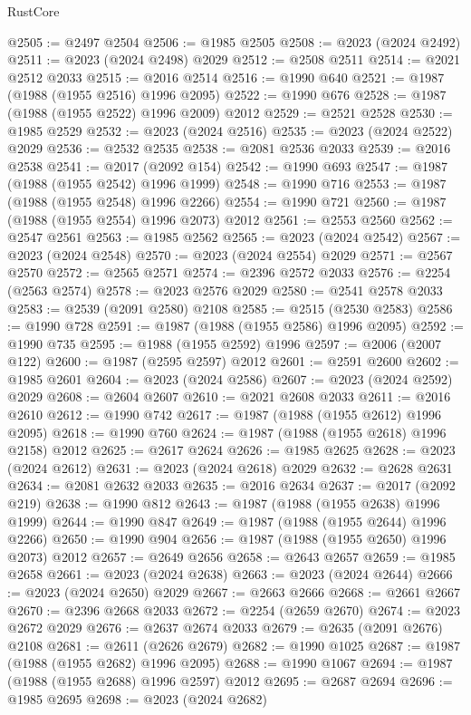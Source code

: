 \begin{lexlean}{RustCore}
\begin{coremodule}
@2505 := @2497 @2504
@2506 := @1985 @2505
@2508 := @2023 (@2024 @2492)
@2511 := @2023 (@2024 @2498) @2029
@2512 := @2508 @2511
@2514 := @2021 @2512 @2033
@2515 := @2016 @2514
@2516 := @1990 @640
@2521 := @1987 (@1988 (@1955 @2516) @1996 @2095)
@2522 := @1990 @676
@2528 := @1987 (@1988 (@1955 @2522) @1996 @2009) @2012
@2529 := @2521 @2528
@2530 := @1985 @2529
@2532 := @2023 (@2024 @2516)
@2535 := @2023 (@2024 @2522) @2029
@2536 := @2532 @2535
@2538 := @2081 @2536 @2033
@2539 := @2016 @2538
@2541 := @2017 (@2092 @154)
@2542 := @1990 @693
@2547 := @1987 (@1988 (@1955 @2542) @1996 @1999)
@2548 := @1990 @716
@2553 := @1987 (@1988 (@1955 @2548) @1996 @2266)
@2554 := @1990 @721
@2560 := @1987 (@1988 (@1955 @2554) @1996 @2073) @2012
@2561 := @2553 @2560
@2562 := @2547 @2561
@2563 := @1985 @2562
@2565 := @2023 (@2024 @2542)
@2567 := @2023 (@2024 @2548)
@2570 := @2023 (@2024 @2554) @2029
@2571 := @2567 @2570
@2572 := @2565 @2571
@2574 := @2396 @2572 @2033
@2576 := @2254 (@2563 @2574)
@2578 := @2023 @2576 @2029
@2580 := @2541 @2578 @2033
@2583 := @2539 (@2091 @2580) @2108
@2585 := @2515 (@2530 @2583)
@2586 := @1990 @728
@2591 := @1987 (@1988 (@1955 @2586) @1996 @2095)
@2592 := @1990 @735
@2595 := @1988 (@1955 @2592) @1996
@2597 := @2006 (@2007 @122)
@2600 := @1987 (@2595 @2597) @2012
@2601 := @2591 @2600
@2602 := @1985 @2601
@2604 := @2023 (@2024 @2586)
@2607 := @2023 (@2024 @2592) @2029
@2608 := @2604 @2607
@2610 := @2021 @2608 @2033
@2611 := @2016 @2610
@2612 := @1990 @742
@2617 := @1987 (@1988 (@1955 @2612) @1996 @2095)
@2618 := @1990 @760
@2624 := @1987 (@1988 (@1955 @2618) @1996 @2158) @2012
@2625 := @2617 @2624
@2626 := @1985 @2625
@2628 := @2023 (@2024 @2612)
@2631 := @2023 (@2024 @2618) @2029
@2632 := @2628 @2631
@2634 := @2081 @2632 @2033
@2635 := @2016 @2634
@2637 := @2017 (@2092 @219)
@2638 := @1990 @812
@2643 := @1987 (@1988 (@1955 @2638) @1996 @1999)
@2644 := @1990 @847
@2649 := @1987 (@1988 (@1955 @2644) @1996 @2266)
@2650 := @1990 @904
@2656 := @1987 (@1988 (@1955 @2650) @1996 @2073) @2012
@2657 := @2649 @2656
@2658 := @2643 @2657
@2659 := @1985 @2658
@2661 := @2023 (@2024 @2638)
@2663 := @2023 (@2024 @2644)
@2666 := @2023 (@2024 @2650) @2029
@2667 := @2663 @2666
@2668 := @2661 @2667
@2670 := @2396 @2668 @2033
@2672 := @2254 (@2659 @2670)
@2674 := @2023 @2672 @2029
@2676 := @2637 @2674 @2033
@2679 := @2635 (@2091 @2676) @2108
@2681 := @2611 (@2626 @2679)
@2682 := @1990 @1025
@2687 := @1987 (@1988 (@1955 @2682) @1996 @2095)
@2688 := @1990 @1067
@2694 := @1987 (@1988 (@1955 @2688) @1996 @2597) @2012
@2695 := @2687 @2694
@2696 := @1985 @2695
@2698 := @2023 (@2024 @2682)

\end{coremodule}
\end{lexlean}
